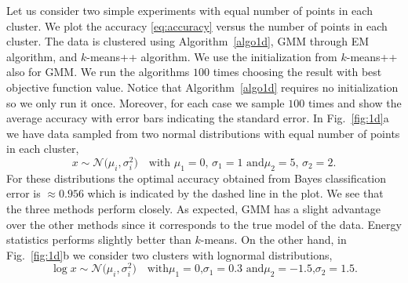 \documentclass[aps,preprint,nofootinbib,floatfix]{revtex4-1}
\begin{document}
Let us consider two simple experiments with equal number of points
in each cluster. We plot the accuracy \eqref{eq:accuracy} versus the number
of points in each cluster.
The data is clustered using 
Algorithm~\ref{algo1d}, 
GMM through EM algorithm, and $k$-means++ 
algorithm. 
We use the initialization from $k$-means++ \cite{Vassilvitskii} also
for GMM.
We run the algorithms $100$
times choosing the result with  best objective function value. 
Notice that Algorithm~\ref{algo1d} requires no initialization so we only
run it once.
Moreover, for each case we sample $100$ times
and show the average accuracy with error bars indicating
the standard error.
In  Fig.~\ref{fig:1d}a 
we have data sampled from two normal distributions with equal number of
points in each cluster,
\begin{equation}
\label{eq:two_normal}
x \sim \mathcal{N}\big(\mu_i,\sigma_i^2\big) 
\quad 
\mbox{with $\mu_1 = 0$, $\sigma_1=1$ and
$\mu_2 = 5$, $\sigma_2 = 2$.}
\end{equation}
For these distributions the optimal accuracy 
obtained from Bayes classification error
is $ \approx 0.956$ which is indicated by the dashed line in the plot.
We see that the three methods
perform closely. As expected, GMM has a slight advantage over the other
methods since
it corresponds to the true model of the data. 
Energy statistics performs slightly better
than $k$-means. On the other hand, in Fig.~\ref{fig:1d}b
we consider two clusters with lognormal distributions,
\begin{equation}
\label{eq:two_lognormal}
\log x \sim \mathcal{N}\big( \mu_i,\sigma_i^2\big) \quad
\mbox{with
$\mu_1 = 0$,
$\sigma_1 = 0.3$ and
$\mu_2 = -1.5$,
$\sigma_2 = 1.5$.}
\end{equation}
\end{document}

